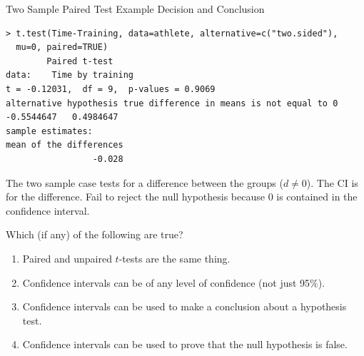 \documentclass[xcolor=svgnames, 10pt, handout]{beamer}
\begin{document}
\begin{frame}[fragile]{Two Sample Paired Test Example Decision and Conclusion}
\begin{Verbatim}[xleftmargin=2em, xrightmargin=1.5em, frame=single, label=Using CI, framesep=0.5em, commandchars=\\\{\}, fontsize=\footnotesize]
> t.test(Time-Training, data=athlete, alternative=c("two.sided"), 
  mu=0, paired=TRUE)
        Paired t-test
data:    Time by training
t = -0.12031,  df = 9,  p-values = 0.9069
alternative hypothesis true difference in means is not equal to 0
-0.5544647   0.4984647
sample estimates:
mean of the differences
                 -0.028
\end{Verbatim}
The two sample case tests for a difference between the groups ($d \neq 0$).  The CI is for the difference.
\vfill
Fail to reject the null hypothesis because 0 is contained in the confidence interval.
\end{frame}


\begin{frame}[fragile]
\begin{question}
Which (if any) of the following are true?
\begin{enumerate}
\item Paired and unpaired $t$-tests are the same thing. \onslide<+-> \pxmark
\item Confidence intervals can be of any level of confidence (not just 95\%). \pcmark
\item Confidence intervals can be used to make a conclusion about a hypothesis test. \pcmark
\item Confidence intervals can be used to prove that the null hypothesis is false. \pxmark
\end{enumerate}
\end{question}
\end{frame}
\end{document}
